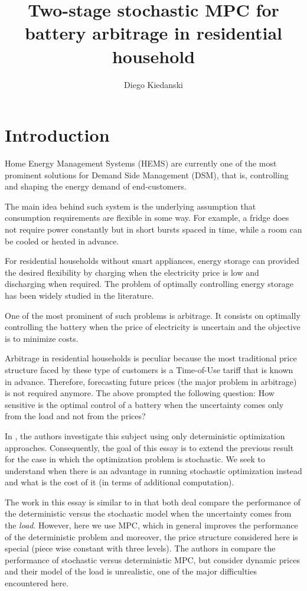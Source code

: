 \documentclass[11pt]{article}
\author{Diego Kiedanski}
\title{Two-stage stochastic MPC for battery arbitrage in residential household}
\theoremstyle{definition}
\begin{document}
\maketitle

\section{Introduction}

Home Energy Management Systems (HEMS) are currently one of the most prominent solutions for Demand Side Management (DSM), that is, controlling and shaping the energy demand of end-customers.

The main idea behind such system is the underlying assumption that consumption requirements are flexible in some way. For example, a fridge does not require power constantly but in short bursts spaced in time, while a room can be cooled or heated in advance. 

For residential households without smart appliances, energy storage can provided the desired flexibility by charging when the electricity price is low and discharging when required. The problem of optimally controlling energy storage has been widely studied in the literature.

One of the most prominent of such problems is arbitrage. It consists on optimally controlling the battery when the price of electricity is uncertain and the objective is to minimize costs.

Arbitrage in residential households is peculiar because the most traditional price structure faced by these type of customers is a Time-of-Use tariff that is known in advance. Therefore, forecasting future prices (the major problem in arbitrage) is not required anymore. The above prompted the following question: How sensitive is the optimal control of a battery when the uncertainty comes only from the load and not from the prices?

In \cite{kiedanski}, the authors investigate this subject using only deterministic optimization approaches. Consequently, the goal of this essay is to extend the previous result for the case in which the optimization problem is stochastic. We seek to understand when there is an advantage in running stochastic optimization instead and what is the cost of it (in terms of additional computation).

The work in this essay is similar to \cite{del2016impact} in that both deal compare the performance of the deterministic versus the stochastic model when the uncertainty comes from the \textit{load}. However, here we use MPC, which in general improves the performance of the deterministic problem and moreover, the price structure considered here is special (piece wise constant with three levels). The authors in \cite{smpc} compare the performance of stochastic versus deterministic MPC, but consider dynamic prices and their model of the load is unrealistic, one of the major difficulties encountered here.
\end{document}
